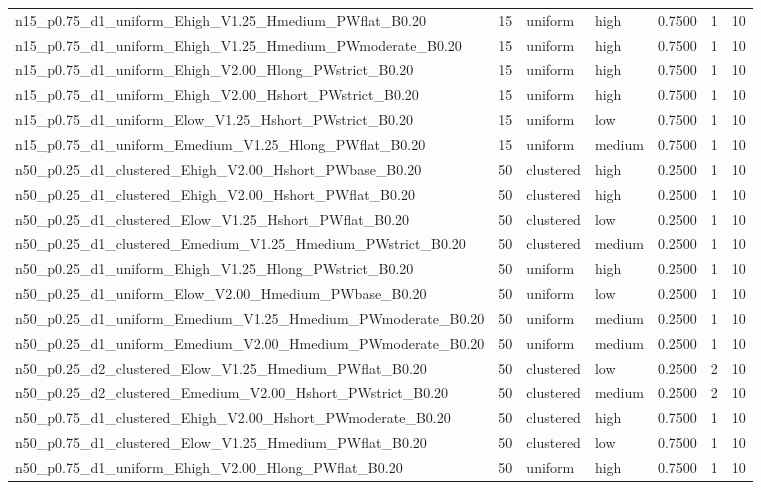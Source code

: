 \begin{tabular}{lrllrrr}
n15_p0.75_d1_uniform_Ehigh_V1.25_Hmedium_PWflat_B0.20 & 15 & uniform & high & 0.7500 & 1 & 10 \\
n15_p0.75_d1_uniform_Ehigh_V1.25_Hmedium_PWmoderate_B0.20 & 15 & uniform & high & 0.7500 & 1 & 10 \\
n15_p0.75_d1_uniform_Ehigh_V2.00_Hlong_PWstrict_B0.20 & 15 & uniform & high & 0.7500 & 1 & 10 \\
n15_p0.75_d1_uniform_Ehigh_V2.00_Hshort_PWstrict_B0.20 & 15 & uniform & high & 0.7500 & 1 & 10 \\
n15_p0.75_d1_uniform_Elow_V1.25_Hshort_PWstrict_B0.20 & 15 & uniform & low & 0.7500 & 1 & 10 \\
n15_p0.75_d1_uniform_Emedium_V1.25_Hlong_PWflat_B0.20 & 15 & uniform & medium & 0.7500 & 1 & 10 \\
n50_p0.25_d1_clustered_Ehigh_V2.00_Hshort_PWbase_B0.20 & 50 & clustered & high & 0.2500 & 1 & 10 \\
n50_p0.25_d1_clustered_Ehigh_V2.00_Hshort_PWflat_B0.20 & 50 & clustered & high & 0.2500 & 1 & 10 \\
n50_p0.25_d1_clustered_Elow_V1.25_Hshort_PWflat_B0.20 & 50 & clustered & low & 0.2500 & 1 & 10 \\
n50_p0.25_d1_clustered_Emedium_V1.25_Hmedium_PWstrict_B0.20 & 50 & clustered & medium & 0.2500 & 1 & 10 \\
n50_p0.25_d1_uniform_Ehigh_V1.25_Hlong_PWstrict_B0.20 & 50 & uniform & high & 0.2500 & 1 & 10 \\
n50_p0.25_d1_uniform_Elow_V2.00_Hmedium_PWbase_B0.20 & 50 & uniform & low & 0.2500 & 1 & 10 \\
n50_p0.25_d1_uniform_Emedium_V1.25_Hmedium_PWmoderate_B0.20 & 50 & uniform & medium & 0.2500 & 1 & 10 \\
n50_p0.25_d1_uniform_Emedium_V2.00_Hmedium_PWmoderate_B0.20 & 50 & uniform & medium & 0.2500 & 1 & 10 \\
n50_p0.25_d2_clustered_Elow_V1.25_Hmedium_PWflat_B0.20 & 50 & clustered & low & 0.2500 & 2 & 10 \\
n50_p0.25_d2_clustered_Emedium_V2.00_Hshort_PWstrict_B0.20 & 50 & clustered & medium & 0.2500 & 2 & 10 \\
n50_p0.75_d1_clustered_Ehigh_V2.00_Hshort_PWmoderate_B0.20 & 50 & clustered & high & 0.7500 & 1 & 10 \\
n50_p0.75_d1_clustered_Elow_V1.25_Hmedium_PWflat_B0.20 & 50 & clustered & low & 0.7500 & 1 & 10 \\
n50_p0.75_d1_uniform_Ehigh_V2.00_Hlong_PWflat_B0.20 & 50 & uniform & high & 0.7500 & 1 & 10 \\

\end{tabular}
